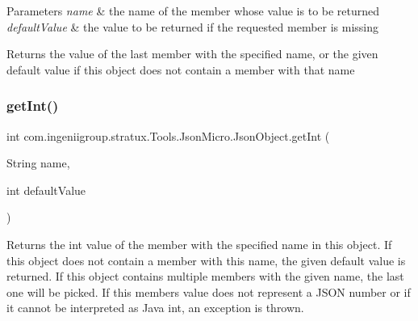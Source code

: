 \begin{DoxyParams}{Parameters}
{\em name} & the name of the member whose value is to be returned \\
\hline
{\em default\+Value} & the value to be returned if the requested member is missing \\
\hline
\end{DoxyParams}
\begin{DoxyReturn}{Returns}
the value of the last member with the specified name, or the given default value if this object does not contain a member with that name 
\end{DoxyReturn}
\mbox{\label{classcom_1_1ingeniigroup_1_1stratux_1_1_tools_1_1_json_micro_1_1_json_object_ae376b8a3200981de126fec81c3889d50}} 
\subsubsection{\texorpdfstring{get\+Int()}{getInt()}}
{\footnotesize\ttfamily int com.\+ingeniigroup.\+stratux.\+Tools.\+Json\+Micro.\+Json\+Object.\+get\+Int (\begin{DoxyParamCaption}\item[{String}]{name,  }\item[{int}]{default\+Value }\end{DoxyParamCaption})}

Returns the {\ttfamily int} value of the member with the specified name in this object. If this object does not contain a member with this name, the given default value is returned. If this object contains multiple members with the given name, the last one will be picked. If this member\textquotesingle{}s value does not represent a J\+S\+ON number or if it cannot be interpreted as Java {\ttfamily int}, an exception is thrown.


